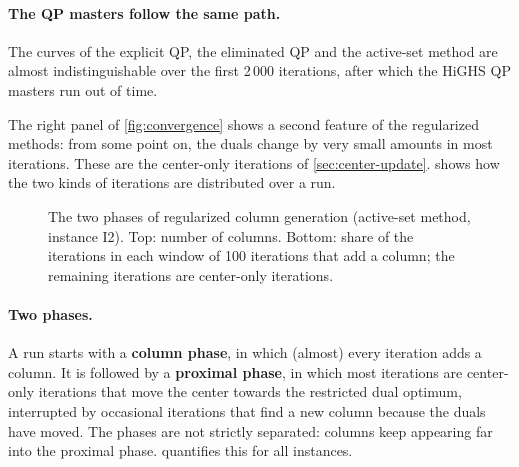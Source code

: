 \paragraph{The QP masters follow the same path.} The curves of the explicit QP, the
eliminated QP and the active-set method are almost indistinguishable over the first 2\,000
iterations, after which the HiGHS QP masters run out of time.

\medskip

The right panel of \cref{fig:convergence} shows a second feature of the regularized methods:
from some point on, the duals change by very small amounts in most iterations. These are the
center-only iterations of \cref{sec:center-update}.  shows how the two kinds
of iterations are distributed over a run.

\begin{figure}[ht]
\centering
{}
\caption{The two phases of regularized column generation (active-set method, instance I2).
Top: number of columns. Bottom: share of the iterations in each window of 100 iterations
that add a column; the remaining iterations are center-only iterations.}
\label{fig:phases}
\end{figure}

\paragraph{Two phases.} A run starts with a \textbf{column phase}, in which (almost) every
iteration adds a column. It is followed by a \textbf{proximal phase}, in which most
iterations are center-only iterations that move the center towards the restricted dual
optimum, interrupted by occasional iterations that find a new column because the duals have
moved. The phases are not strictly separated: columns keep appearing far into the proximal
phase.
 quantifies this for all instances.

